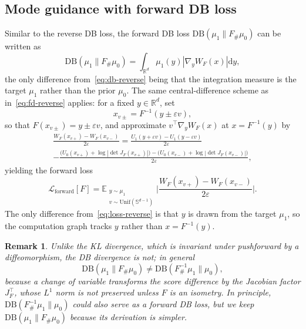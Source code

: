 \documentclass{article}
\newtheorem*{remark}{Remark}
\newcommand{\D}{\mathrm{d}}
\newcommand{\DB}{\mathrm{DB}}
\theoremstyle{plain}
\begin{document}
\subsection{Mode guidance with forward DB loss}

Similar to the reverse DB loss, the forward DB loss $\DB(\mu_1\|F_{\#}\mu_0)$ can be written as
\begin{equation}\label{eq:db-forward}
    \DB(\mu_1\|F_{\#}\mu_0) = \int_{\mathbb R^d} \mu_1(y) |\nabla_y W_F(x)| \D y,
\end{equation}
the only difference from~\eqref{eq:db-reverse} being that the integration measure is the target $\mu_1$ rather than the prior $\mu_0$. The same central-difference scheme as in~\eqref{eq:fd-reverse} applies: for a fixed $y \in \mathbb R^d$, set
\begin{equation}\label{eq:xpm-forward}
    x_{v\pm} = F^{-1}(y \pm \varepsilon v),
\end{equation}
so that $F(x_{v\pm}) = y \pm \varepsilon v$, and approximate $v^\top \nabla_y W_F(x)$ at $x = F^{-1}(y)$ by
\begin{multline}\label{eq:fd-forward-explicit}
    \frac{W_F(x_{v+}) - W_F(x_{v-})}{2\varepsilon} = \frac{U_1(y + \varepsilon v) - U_1(y - \varepsilon v)}{2\varepsilon} \\
    - \frac{\bigl(U_0(x_{v+}) + \log|\det J_F(x_{v+})|\bigr) - \bigl(U_0(x_{v-}) + \log|\det J_F(x_{v-})|\bigr)}{2\varepsilon},
\end{multline}
yielding the forward loss
\begin{equation}\label{eq:loss-forward}
    \mathcal L_{\mathrm{forward}}[F] = \mathbb E_{\substack{y \sim \mu_1 \\ v \sim \mathrm{Unif}(\mathbb S^{d-1})}} \biggl|\frac{W_F(x_{v+}) - W_F(x_{v-})}{2\varepsilon}\biggr|.
\end{equation}
The only difference from~\eqref{eq:loss-reverse} is that $y$ is drawn from the target $\mu_1$, so the computation graph tracks $y$ rather than $x = F^{-1}(y)$.

\begin{remark}
    Unlike the KL divergence, which is invariant under pushforward by a diffeomorphism, the DB divergence is not; in general
    \begin{equation*}
        \DB(\mu_1\|F_{\#}\mu_0) \neq \DB(F^{-1}_{\#}\mu_1\|\mu_0),
    \end{equation*}
    because a change of variable transforms the score difference by the Jacobian factor $J_F^\top$, whose $L^1$ norm is not preserved unless $F$ is an isometry. In principle, $\DB(F^{-1}_{\#}\mu_1\|\mu_0)$ could also serve as a forward DB loss, but we keep $\DB(\mu_1\|F_{\#}\mu_0)$ because its derivation is simpler.
\end{remark}
\end{document}
